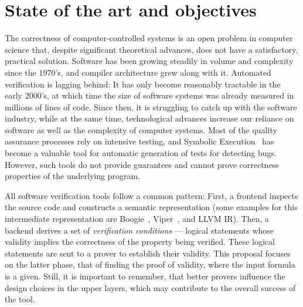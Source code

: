 \section{State of the art and objectives}

The correctness of computer-controlled systems is an open problem in computer science that, despite significant theoretical advances, does not have a satisfactory, practical solution.
Software has been growing steadily in volume and complexity since the 1970's, and compiler architecture grew along with it.
Automated verification is lagging behind: It has only become reasonably tractable in the early 2000's, at which time the size of software systems was already measured in millions of lines of code.
Since then, it is struggling to catch up with the software industry, while at the same time, technological advances increase our reliance on software as well as the complexity of computer systems.
Most of the quality assurance processes rely on intensive testing, and Symbolic Execution~\cite{symex30years} has become a valuable tool for automatic generation of tests for detecting bugs.
However, such tools do not provide guarantees and cannot prove correctness properties of the underlying program.

All software verification tools follow a common pattern:
First, a frontend inspects the source code and constructs a semantic representation (some examples for this intermediate representation are Boogie~\cite{PASTE2005:Barnett}, Viper~\cite{VMCAI2016:Muller}, and LLVM IR).
Then, a backend derives a set of \emph{verification conditions} --- logical statements whose validity implies the correctness of the property being verified.
These logical statements are sent to a prover to establish their validity.
This proposal focuses on the latter phase, that of finding the proof of validity, where the input formula is a given.
Still, it is important to remember, that better provers influence the design choices in the upper layers, which may contribute to the overall success of the tool.

